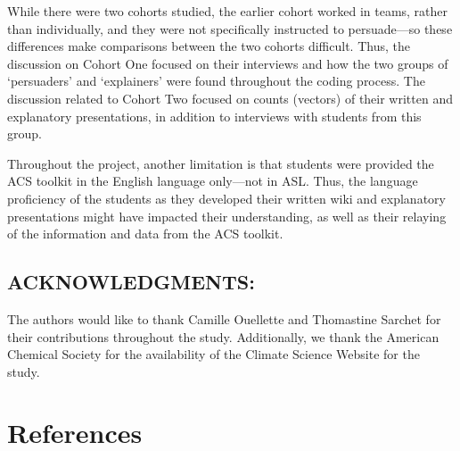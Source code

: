 \documentclass[11.5pt]{sig-alternate} %
\begin{document}
\begin{large}
While there were two cohorts studied, the earlier cohort worked in teams, rather than individually, and they were not specifically instructed to persuade—so these differences make comparisons between the two cohorts difficult. Thus, the discussion on Cohort One focused on their interviews and how the two groups of ‘persuaders’ and ‘explainers’ were found throughout the coding process.  The discussion related to Cohort Two focused on counts (vectors) of their written and explanatory presentations, in addition to interviews with students from this group.

Throughout the project, another limitation is that students were provided the ACS toolkit in the English language only—not in ASL. Thus, the language proficiency of the students as they developed their written wiki and explanatory presentations might have impacted their understanding, as well as their relaying of the information and data from the ACS toolkit. 

\subsection*{ACKNOWLEDGMENTS:} The authors would like to thank Camille Ouellette and Thomastine Sarchet for their contributions throughout the study. Additionally, we thank the American Chemical Society for the availability of the Climate Science Website for the study.

\end{large}
\clearpage
\section*{References}\par 
\end{document}
